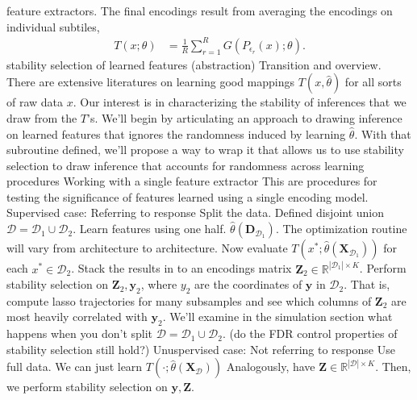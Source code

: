 \documentclass[11pt]{article}
\begin{document}
\begin{outline}
    feature extractors. The final encodings result from averaging the encodings on
    individual subtiles,
    \begin{align}
      T\left(x; \theta\right) &= \frac{1}{R}\sum_{r = 1}^{R} G\left(P_{\epsilon_{r}}\left(x\right); \theta\right).
    \end{align}
\1 stability selection of learned features (abstraction)
  \2 Transition and overview. There are extensive literatures on learning good
  mappings $T\left(x, \hat{\theta}\right)$ for all sorts of raw data $x$. Our
  interest is in characterizing the stability of inferences that we draw from
  the $T$'s.
    \3 We'll begin by articulating an approach to drawing inference on learned
    features that ignores the randomness induced by learning $\hat{\theta}$.
    \3 With that subroutine defined, we'll propose a way to wrap it that allows
    us to use stability selection to draw inference that accounts for randomness
    across learning procedures
  \2 Working with a single feature extractor
    \3 This are procedures for testing the significance of features learned
    using a single encoding model.
    \3 Supervised case: Referring to response
      \4 Split the data. Defined disjoint union $\mathcal{D} = \mathcal{D}_{1} \cup \mathcal{D}_{2}$.
      \4 Learn features using one half.
      $\hat{\theta}\left(\mathbf{D}_{\mathcal{D}_{1}}\right)$. The optimization
      routine will vary from architecture to architecture.
      \4 Now evaluate $T\left(x^{\ast};
      \hat{\theta}\left(\mathbf{X}_{\mathcal{D}_{1}}\right)\right)$ for each
      $x^{\ast} \in \mathcal{D}_{2}$. Stack the results in to an encodings
      matrix $\mathbf{Z}_{2} \in \mathbb{R}^{\left|\mathcal{D}_{1}\right| \times
        K}$.
      \4 Perform stability selection on $\mathbf{Z}_{2}, \mathbf{y}_{2}$, where
      $y_{2}$ are the coordinates of $\mathbf{y}$ in $\mathcal{D}_{2}$. That is,
      compute lasso trajectories for many subsamples and see which columns of
      $\mathbf{Z}_{2}$ are most heavily correlated with $\mathbf{y}_{2}$.
      \4 We'll examine in the simulation section what happens when you don't
      split $\mathcal{D} = \mathcal{D}_{1} \cup \mathcal{D}_{2}$. (do the FDR
      control properties of stability selection still hold?)
    \3 Unuspervised case: Not referring to response
      \4 Use full data. We can just learn $T\left(\cdot;
      \hat{\theta}\left(\mathbf{X}_{\mathcal{D}}\right)\right)$
      \4 Analogously, have $\mathbf{Z} \in \mathbb{R}^{\left|\mathcal{D}\right| \times K}$.
      \4 Then, we perform stability selection on $\mathbf{y}, \mathbf{Z}$.

\end{outline}
\end{document}
